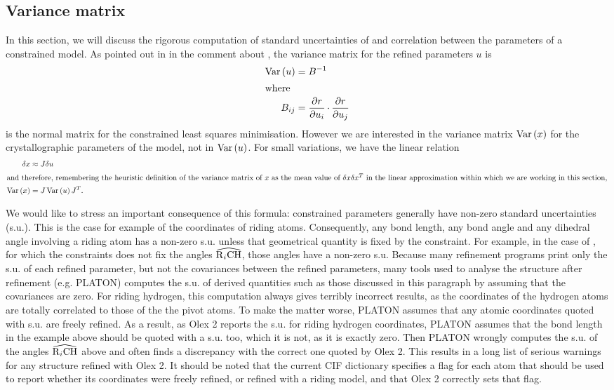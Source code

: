 \documentclass[pdf]{iucr}
\begin{document}
\subsection{Variance matrix}
In this section, we will discuss the rigorous computation of standard uncertainties of and correlation between the parameters of a constrained model. As pointed out in  in the comment about , the variance matrix for the refined parameters $u$ is
\begin{align}
\mathrm{Var}\left(u\right) &= B^{-1}\\
\intertext{where}
B_{ij} &= \frac{\partial r}{\partial u_i} \operatorname{\cdot} \frac{\partial r}{\partial u_j}
\end{align}
is the normal matrix for the constrained least squares minimisation. However we are interested in the variance matrix $\mathrm{Var}\left(x\right)$ for the crystallographic parameters of the model, not in $\mathrm{Var}\left(u\right)$. For small variations, we have the linear relation
\begin{align}
\delta x &\approx J \delta u\\
\intertext{and therefore, remembering the heuristic definition of the variance matrix of $x$ as the mean value of $\delta x \delta x^T$ in the linear approximation within which we are working in this section,}
\mathrm{Var}\left(x\right) &= J\, \mathrm{Var}\left(u\right) J^T.
\end{align} 

We would like to stress an important consequence of this formula: constrained parameters generally have non-zero standard uncertainties (s.u.). This is the case for example of the coordinates of riding atoms. Consequently, any bond length, any bond angle and any dihedral angle involving a riding atom has a non-zero s.u. unless that geometrical quantity is fixed by the constraint. For example, in the case of , for which the constraints does not fix the angles $\widehat{\ce{R$_i$CH}}$, those angles have a non-zero s.u. Because many refinement programs print only the s.u. of each refined parameter, but not the covariances between the refined parameters, many tools used to analyse the structure after refinement (e.g. PLATON) computes the s.u. of derived quantities such as those discussed in this paragraph by assuming that the covariances are zero. For riding hydrogen, this computation always gives terribly incorrect results, as the coordinates of the hydrogen atoms are totally correlated to those of the the pivot atoms. To make the matter worse, PLATON assumes that any atomic coordinates quoted with s.u. are freely refined. As a result, as Olex 2 reports the s.u. for riding hydrogen coordinates, PLATON assumes that the bond length  in the example above should be quoted with a s.u. too, which it is not, as it is exactly zero. Then PLATON wrongly computes the s.u. of the angles $\widehat{\ce{R$_i$CH}}$ above and often finds a discrepancy with the correct one quoted by Olex 2. This results in a long list of serious warnings for any structure refined with Olex 2. It should be noted that the current CIF dictionary specifies a flag for each atom that should be used to report whether its coordinates were freely refined, or refined with a riding model, and that Olex 2 correctly sets that flag.
\end{document}
